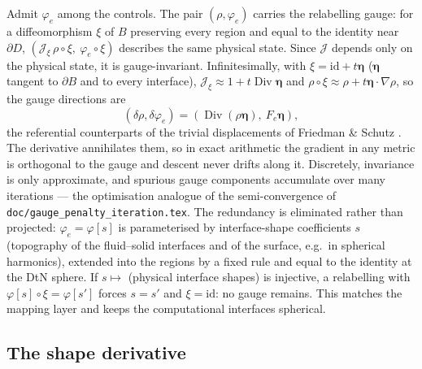\documentclass[11pt]{article}
\newcommand{\Jf}{\mathscr{J}}  %
\newcommand{\bfeta}{\bm{\eta}}
\newcommand{\Div}{\operatorname{Div}}
\begin{document}
Admit $\varphi_e$ among the controls. The pair $(\rho,\varphi_e)$
carries the relabelling gauge: for a diffeomorphism $\xi$ of $B$
preserving every region and equal to the identity near $\partial D$,
$(\Jf _\xi\,\rho\circ\xi,\ \varphi_e\circ\xi)$ describes the same physical
state. Since $\Jf $ depends only on the physical state, it is
gauge-invariant. Infinitesimally, with $\xi = \mathrm{id} + t\bfeta$
($\bfeta$ tangent to $\partial B$ and to every interface), $\Jf _\xi \approx
1 + t\Div\bfeta$ and $\rho\circ\xi \approx \rho + t\bfeta\cdot\nabla\rho$,
so the gauge directions are
\begin{equation}
  (\delta\rho, \delta\varphi_e) = (\Div(\rho\bfeta),\ F_e\bfeta),
\end{equation}
the referential counterparts of the trivial displacements of
Friedman \& Schutz \cite{FriedmanSchutz1978}. The derivative annihilates
them, so in exact arithmetic the gradient in any metric is orthogonal to
the gauge and descent never drifts along it. Discretely, invariance is
only approximate, and spurious gauge components accumulate over many
iterations --- the optimisation analogue of the semi-convergence of
\texttt{doc/gauge\_penalty\_iteration.tex}. The redundancy is eliminated
rather than projected: $\varphi_e = \varphi[s]$ is parameterised by
interface-shape coefficients $s$ (topography of the fluid--solid
interfaces and of the surface, e.g.\ in spherical harmonics), extended
into the regions by a fixed rule and equal to the identity at the DtN
sphere. If $s\mapsto$ (physical interface shapes) is injective, a
relabelling with $\varphi[s]\circ\xi = \varphi[s']$ forces $s = s'$ and
$\xi = \mathrm{id}$: no gauge remains. This matches the mapping layer and
keeps the computational interfaces spherical.

\subsection{The shape derivative}
\end{document}
